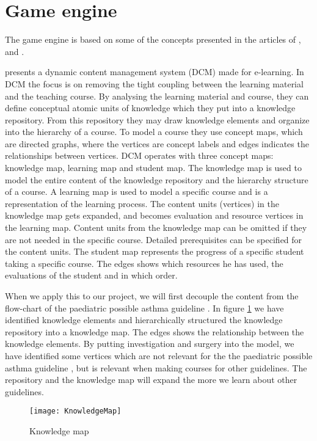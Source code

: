 \section{Game engine}
The game engine is based on some of the concepts presented in the articles of \textcite{Eide2008}, \textcite{Kristensen2011} and \textcite{Kristensen2013}.

\textcite{Eide2008} presents a dynamic content management system (DCM) made for e-learning. In DCM the focus is on removing the tight coupling between the learning material and the teaching course. By analysing the learning material and course, they can define conceptual atomic units of knowledge which they put into a knowledge repository. From this repository they may draw knowledge elements and organize into the hierarchy of a course. To model a course they use concept maps, which are directed graphs, where the vertices are concept labels and edges indicates the relationships between vertices. DCM operates with three concept maps: knowledge map, learning map and student map. The knowledge map is used to model the entire content of the knowledge repository and the hierarchy structure of a course. A learning map is used to model a specific course and is a representation of the learning process. The content units (vertices) in the knowledge map gets expanded, and becomes evaluation and resource vertices in the learning map. Content units from the knowledge map can be omitted if they are not needed in the specific course. Detailed prerequisites can be specified for the content units. The student map represents the progress of a specific student taking a specific course. The edges shows which resources he has used, the evaluations of the student and in which order. 


When we apply this to our project, we will first decouple the content from the flow-chart of the paediatric possible asthma guideline \parencite{RepublicofKeny2016}. In figure \ref{fig:KnowledgeMap} we have identified knowledge elements and hierarchically structured the knowledge repository into a knowledge map. The edges shows the relationship between the knowledge elements. By putting investigation and surgery into the model, we have identified some vertices which are not relevant for the the paediatric possible asthma guideline \parencite{RepublicofKeny2016}, but is relevant when making courses for other guidelines. The repository and the knowledge map will expand the more we learn about other guidelines.

\begin{figure}[h!]
	\caption {Knowledge map}
	\label{fig:KnowledgeMap}
	\texttt{[image: KnowledgeMap]}
\end{figure}

